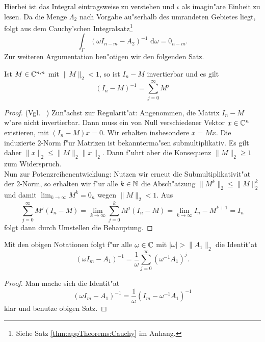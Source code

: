 Hierbei ist das Integral eintragsweise zu verstehen und $\iota$ als imagin"are Einheit zu lesen.
Da die Menge $\Lambda_2$ nach Vorgabe au"serhalb des umrandeten Gebietes liegt, folgt aus dem Cauchy'schen Integralsatz\footnote{Siehe Satz \ref{thm:appTheorems:Cauchy} im Anhang.}
\[
\int_\Gamma (\omega I_{n-m} - A_2)^{-1} \text{ d}\omega = 0_{n-m}.
\]
Zur weiteren Argumentation ben"otigen wir den folgenden Satz.

\begin{thm}\label{potenzreihe}
Ist $M\in\mathbb{C}^{n,n}$ mit $\|M\|_2 < 1$, so ist $I_n - M$ invertierbar und es gilt
\[
(I_n - M)^{-1} = \sum_{j=0}^\infty M^j
\]
\end{thm}

\begin{proof} (Vgl. ~\cite[Abschnitt 2.3.4]{loan})
Zun"achst zur Regularit"at: Angenommen, die Matrix $I_n-M$ w"are nicht invertierbar. Dann muss ein von Null verschiedener Vektor $x\in\mathbb{C}^n$ existieren, mit $(I_n-M)x = 0$.
Wir erhalten insbesondere $x = Mx$. Die induzierte $2$-Norm f"ur Matrizen ist bekannterma"sen submultiplikativ.
Es gilt daher $\|x\|_2 \le \|M\|_2\|x\|_2$. Dann f"uhrt aber die Konsequenz $\|M\|_2 \ge 1$ zum Widerspruch.\\

Nun zur Potenzreihenentwicklung: Nutzen wir erneut die Submultiplikativit"at der $2$-Norm, so erhalten wir f"ur alle $k\in\mathbb{N}$ die Absch"atzung $\|M^k\|_2 \le \|M\|_2^k$ und damit
$\lim_{k\to\infty} M^k = 0_n$ wegen $\|M\|_2 <1$. Aus
\[
\sum_{j=0}^\infty M^j (I_n-M) =
\lim_{k\to\infty}\sum_{j=0}^k M^j (I_n-M) =
\lim_{k\to\infty} I_n-M^{k+1} = I_n
\]
folgt dann durch Umstellen die Behauptung.
\end{proof}

\begin{kor}\label{kor:chap3:potenzreihe}
Mit den obigen Notationen folgt f"ur alle $\omega\in\mathbb{C}$ mit $|\omega| > \|A_1\|_2$ die Identit"at
\[
(\omega I_m - A_1)^{-1} = \frac{1}{\omega} \sum_{j=0}^\infty (\omega^{-1} A_1)^j.
\]
\end{kor}
\begin{proof}
Man mache sich die Identit"at
\[
(\omega I_m - A_1)^{-1} = \frac{1}{\omega}(I_m - \omega^{-1}A_1)^{-1}
\]
klar und benutze obigen Satz.
\end{proof}

